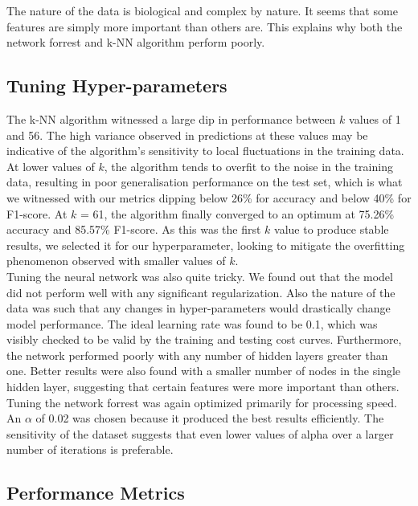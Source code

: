 \documentclass{article}
\begin{document}
The nature of the data is biological and complex by nature. It seems that some features are simply more important than others are. 
This explains why both the network forrest and k-NN algorithm perform poorly.

\subsection*{Tuning Hyper-parameters}

The k-NN algorithm witnessed a large dip in performance between $k$ values of 1 and 56.
The high variance observed in predictions at these values may be indicative of 
the algorithm's sensitivity to local fluctuations in the training data. 
At lower values of $k$, the algorithm tends to overfit to the noise in the training data, 
resulting in poor generalisation performance on the test set,
which is what we witnessed with our metrics dipping below 26\% for accuracy and below 40\% for F1-score.
At $k$ = 61, the algorithm finally converged to an optimum at 75.26\% accuracy and 85.57\% F1-score.
As this was the first $k$ value to produce stable results, we selected it for our hyperparameter, 
looking to mitigate the overfitting phenomenon observed with smaller values of $k$.
\\

Tuning the neural network was also quite tricky. We found out that the model did not perform well with any significant regularization.
Also the nature of the data was such that any changes in hyper-parameters would drastically change model performance.
The ideal learning rate was found to be 0.1, which was visibly checked to be valid by the training and testing cost curves.
Furthermore, the network performed poorly with any number of hidden layers greater than one. Better results were also found with a smaller number of nodes in
the single hidden layer, suggesting that certain features were more important than others.
\\

Tuning the network forrest was again optimized primarily for processing speed. An $\alpha$ of 0.02 was chosen because it produced the best results efficiently.
The sensitivity of the dataset suggests that even lower values of alpha over a larger number of iterations is preferable.

\subsection*{Performance Metrics}
\end{document}
